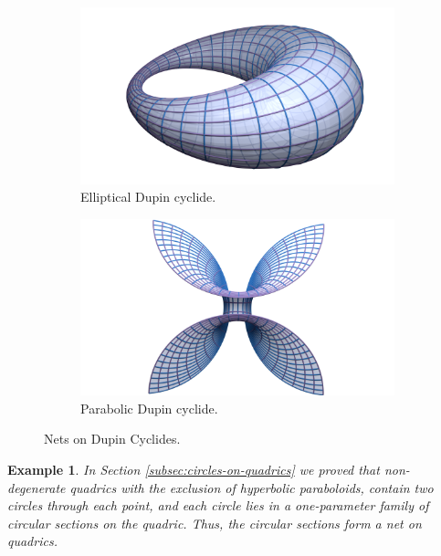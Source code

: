\documentclass[10pt, a4paper]{article}
\theoremstyle{BoldTopSpacing}
\theoremstyle{BoldTopSpacing}
\theoremstyle{BoldTopSpacing}
\theoremstyle{BoldTopBottomSpacing}
\theoremstyle{BoldTopSpacing}
\theoremstyle{BoldTopBottomSpacing}
\newtheorem{example}{Example}[section]
\theoremstyle{remark}
\begin{document}
\begin{figure}[H]
  \begin{subfigure}[b]{0.5\textwidth}
    \includegraphics[width=\textwidth]{Dupin-net.png}
    \caption{Elliptical Dupin cyclide.}
    \label{fig:ellipto-hyperbolic-cyclides}
  \end{subfigure}
  \hfill
  \begin{subfigure}[b]{0.5\textwidth}
    \includegraphics[width=\textwidth]{Dupin-net-2.png}
    \caption{Parabolic Dupin cyclide.}
    \label{fig:parabolic-cyclides}
  \end{subfigure}
  \caption{Nets on Dupin Cyclides.}
\end{figure}

\begin{example}
\label{ex:circular-sections-form-nets-on-quadrics}
In Section \ref{subsec:circles-on-quadrics} we proved that non-degenerate quadrics \textemdash with the exclusion of hyperbolic paraboloids, contain two circles through each point, and each circle lies in a one-parameter family of circular sections on the quadric. Thus, the circular sections form a net on quadrics.
\end{example}
\end{document}
